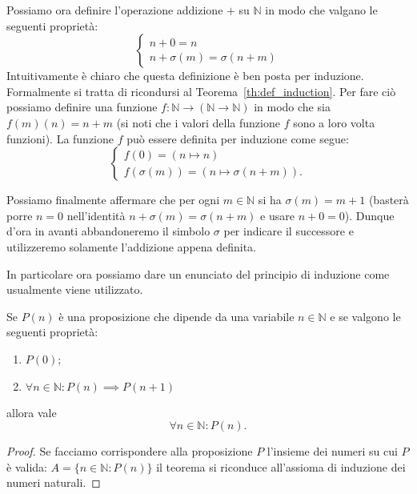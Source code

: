 \documentclass[italian,a4paper,twosides,headinclude]{scrbook}
\newcommand{\NN}{\mathbb N}
\begin{document}
Possiamo ora definire l'operazione addizione $+$ su $\NN$ in modo che valgano le seguenti proprietà:
\[
   \begin{cases}
     n + 0 = n \\
     n + \sigma(m) = \sigma(n+m)
   \end{cases}
\]
Intuitivamente è chiaro che questa definizione è ben posta per induzione.
Formalmente si tratta di ricondursi al
Teorema~\ref{th:def_induction}. Per fare ciò possiamo definire una funzione
$f\colon \NN \to (\NN\to \NN)$ in modo che sia $f(m)(n) = n+m$
(si noti che i valori della funzione $f$ sono a loro volta funzioni).
La funzione $f$ può essere definita
per induzione come segue:
\[
 \begin{cases}
 f(0) = (n\mapsto n)\\
 f(\sigma(m)) = (n\mapsto \sigma(n+m)).
 \end{cases}
\]

Possiamo finalmente affermare che per ogni $m\in \NN$ si ha $\sigma(m)=m+1$ (basterà porre $n=0$ nell'identità $n+\sigma(m)=\sigma(n+m)$ e usare $n+0=0$).
Dunque d'ora in avanti abbandoneremo il simbolo $\sigma$ per indicare il successore e utilizzeremo solamente l'addizione appena definita.

In particolare ora possiamo dare un enunciato del principio di induzione come usualmente viene utilizzato.

\begin{theorem}
Se $P(n)$ è una proposizione che dipende da una variabile $n\in \NN$ e se valgono le seguenti proprietà:
\begin{enumerate}
\item $P(0)$;
\item $\forall n\in \NN\colon P(n) \implies P(n+1)$
\end{enumerate}
allora vale
\[
  \forall n\in \NN \colon P(n).
\]
\end{theorem}
\begin{proof}
Se facciamo corrispondere alla proposizione $P$ l'insieme dei numeri su
cui $P$ è valida: $A=\{n\in \NN\colon P(n)\}$ il teorema
si riconduce all'assioma di induzione dei numeri naturali.
\end{proof}
\end{document}
